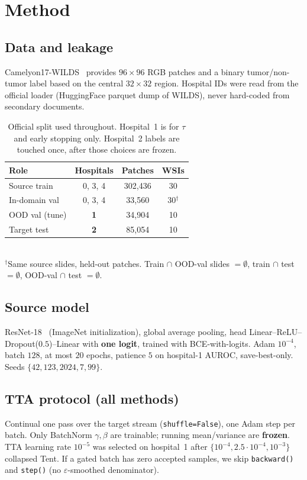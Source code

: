 \documentclass[conference]{IEEEtran}
\begin{document}
\section{Method}

\subsection{Data and leakage}
Camelyon17-WILDS~\cite{koh2021wilds} provides $96\times96$ RGB patches and a binary tumor/non-tumor label based on the central $32\times32$ region.
Hospital IDs were read from the official loader (HuggingFace parquet dump of WILDS), never hard-coded from secondary documents.

\begin{table}[t]
\centering
\caption{Official split used throughout. Hospital~1 is for $\tau$ and early stopping only. Hospital~2 labels are touched once, after those choices are frozen.}
\label{tab:splits}
\small
\begin{tabular}{@{}lccc@{}}
\toprule
Role & Hospitals & Patches & WSIs \\
\midrule
Source train & 0, 3, 4 & 302{,}436 & 30 \\
In-domain val & 0, 3, 4 & 33{,}560 & 30$^\dagger$ \\
OOD val (tune) & \textbf{1} & 34{,}904 & 10 \\
Target test & \textbf{2} & 85{,}054 & 10 \\
\bottomrule
\end{tabular}\\[2pt]
{\scriptsize $^\dagger$Same source slides, held-out patches. Train $\cap$ OOD-val slides $=\emptyset$, train $\cap$ test $=\emptyset$, OOD-val $\cap$ test $=\emptyset$.}
\end{table}

\subsection{Source model}
ResNet-18~\cite{he2016resnet} (ImageNet initialization), global average pooling, head Linear--ReLU--Dropout($0.5$)--Linear with \textbf{one logit}, trained with BCE-with-logits.
Adam $10^{-4}$, batch $128$, at most $20$ epochs, patience $5$ on hospital-1 AUROC, save-best-only.
Seeds $\{42,123,2024,7,99\}$.

\subsection{TTA protocol (all methods)}
Continual one pass over the target stream (\texttt{shuffle=False}), one Adam step per batch.
Only BatchNorm $\gamma,\beta$ are trainable; running mean/variance are \textbf{frozen}.
TTA learning rate $10^{-5}$ was selected on hospital~1 after $\{10^{-4},2.5\cdot10^{-4},10^{-3}\}$ collapsed Tent.
If a gated batch has zero accepted samples, we skip \texttt{backward()} and \texttt{step()} (no $\varepsilon$-smoothed denominator).
\end{document}

